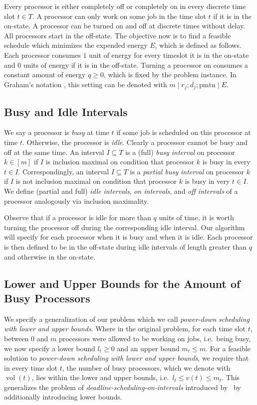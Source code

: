 \documentclass[a4paper]{article}
\DeclareMathOperator{\vol}{vol}
\begin{document}
Every processor is either completely off or completely on in every discrete time slot $t \in T$.
A processor can only work on some job in the time slot $t$ if it is in the on-state.
A processor can be turned on and off at discrete times without delay.
All processors start in the off-state.
The objective now is to find a feasible schedule which minimizes the expended energy $E$, which is defined as follows.
Each processor consumes $1$ unit of energy for every timeslot it is in the on-state and $0$ units of energy if it is in the off-state.
Turning a processor on consumes a constant amount of energy $q \geq 0$, which is fixed by the problem instance.
In Graham's notation \citep{graham}, this setting can be denoted with $m \mid r_j; \overline{d_j}; \mathrm{pmtn} \mid E$.

\subsection{Busy and Idle Intervals}
We say a processor is \emph{busy} at time $t$ if some job is scheduled on this processor at time $t$.
Otherwise, the processor is \emph{idle}.
Clearly a processor cannot be busy and off at the same time.
An interval $I \subseteq T$ is a (full) \emph{busy interval} on processor $k \in [m]$ if $I$ is inclusion maximal on condition that processor $k$ is busy in every $t \in I$.
Correspondingly, an interval $I \subseteq T$ is a \emph{partial busy interval} on processor $k$ if $I$ is not inclusion maximal on condition that processor $k$ is busy in very $t \in I$.
We define (partial and full) \emph{idle intervals}, \emph{on intervals}, and \emph{off intervals} of a processor analogously via inclusion maximality.

Observe that if a processor is idle for more than $q$ units of time, it is worth turning the processor off during the corresponding idle interval.
Our algorithm will specify for each processor when it is busy and when it is idle.
Each processor is then defined to be in the off-state during idle intervals of length greater than $q$ and otherwise in the on-state.

\subsection{Lower and Upper Bounds for the Amount of Busy Processors}
We specify a generalization of our problem which we call \emph{power-down scheduling with lower and upper bounds}.
Where in the original problem, for each time slot $t$, between $0$ and $m$ processors were allowed to be working on jobs, i.e.\ being busy, we now specify a lower bound $l_t \geq 0$ and an upper bound $m_t \leq m$.
For a feasible solution to \emph{power-down scheduling with lower and upper bounds}, we require that in every time slot $t$, the number of busy processors, which we denote with $\vol(t)$, lies within the lower and upper bounds, i.e.\ $l_t \leq v(t) \leq m_t$.
This generalizes the problem of \emph{deadline-scheduling-on-intervals} introduced by~\cite{antoniadis} by additionally introducing lower bounds.
\end{document}
